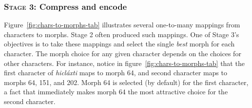 {%

\subsubsection{\textsc{Stage 3:} Compress and encode}


Figure~\ref{fig:chars-to-morphs-tab} illustrates several one-to-many mappings from 
characters to morphs. Stage 2 often produced such mappings.
One of Stage 3's objectives is to take these mappings and select the single \emph{best} morph for each character.
 The morph choice for any given character depends on the choices 
for other characters. For instance, notice in figure~\ref{fig:chars-to-morphs-tab} that the first 
character of \textit{hicl\'{a}xti} maps to morph 64, and second character maps to 
morphs  64, 151, and 202. Morph 64 is selected (by default) for the first character, 
a fact that immediately makes morph 64 the most attractive choice for the second character.



}
